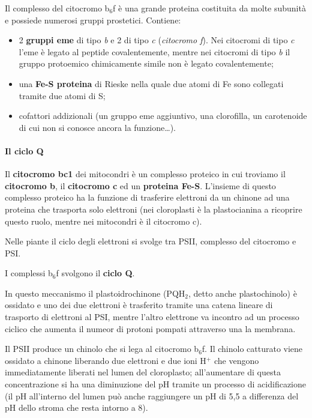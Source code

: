 \documentclass[]{article}
\begin{document}
Il complesso del citocromo b$_6$f è una grande proteina costituita da
molte subunità e possiede numerosi gruppi prostetici. Contiene:

\begin{itemize}
\itemsep1pt\parskip0pt
\item
  2 \textbf{gruppi eme} di tipo \emph{b} e 2 di tipo \emph{c}
  (\emph{citocromo f}). Nei citocromi di tipo \emph{c} l'eme è legato al
  peptide covalentemente, mentre nei citocromi di tipo \emph{b} il
  gruppo protoemico chimicamente simile non è legato covalentemente;
\item
  una \textbf{Fe-S proteina} di Rieske nella quale due atomi di Fe sono
  collegati tramite due atomi di S;
\item
  cofattori addizionali (un gruppo eme aggiuntivo, una clorofilla, un
  carotenoide di cui non si conosce ancora la funzione\ldots{}).
\end{itemize}

\paragraph{Il ciclo Q}\label{il-ciclo-q}

Il \textbf{citocromo bc1} dei mitocondri è un complesso proteico in cui
troviamo il \textbf{citocromo b}, il \textbf{citocromo c} ed un
\textbf{proteina Fe-S}. L'insieme di questo complesso proteico ha la
funzione di trasferire elettroni da un chinone ad una proteina che
trasporta solo elettroni (nei cloroplasti è la plastocianina a ricoprire
questo ruolo, mentre nei mitocondri è il citocromo c).

Nelle piante il ciclo degli elettroni si svolge tra PSII, complesso del
citocromo e PSI.

I complessi b$_6$f svolgono il \textbf{ciclo Q}.

In questo meccanismo il plastoidrochinone (PQH$_2$, detto anche
plastochinolo) è ossidato e uno dei due elettroni è trasferito tramite
una catena lineare di trasporto di elettroni al PSI, mentre l'altro
elettrone va incontro ad un processo ciclico che aumenta il numeor di
protoni pompati attraverso una la membrana.

Il PSII produce un chinolo che si lega al citocromo b$_6$f. Il chinolo
catturato viene ossidato a chinone liberando due elettroni e due ioni
H$^+$ che vengono immediatamente liberati nel lumen del cloroplasto;
all'aumentare di questa concentrazione si ha una diminuzione del pH
tramite un processo di acidificazione (il pH all'interno del lumen può
anche raggiungere un pH di 5,5 a differenza del pH dello stroma che
resta intorno a 8).
\end{document}
